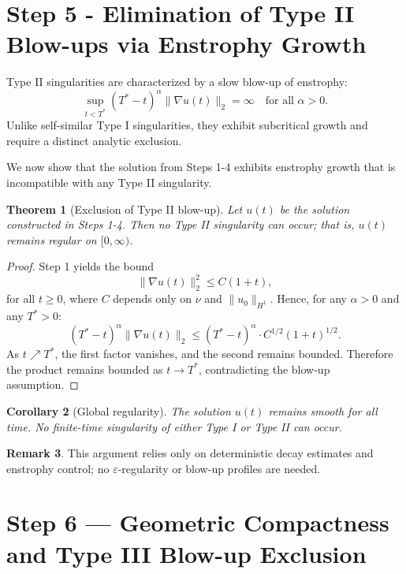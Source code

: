 \documentclass[11pt]{article}
\newtheorem{theorem}{Theorem}[section]
\newtheorem{corollary}[theorem]{Corollary}
\theoremstyle{definition}
\newtheorem{remark}[theorem]{Remark}
\begin{document}
\section{Step 5 - Elimination of Type II Blow-ups via Enstrophy Growth}
\label{sec:step5}

Type II singularities are characterized by a slow blow-up of enstrophy:
\[
\sup_{t < T^*} (T^* - t)^\alpha \|\nabla u(t)\|_2 = \infty \quad \text{for all } \alpha > 0.
\]
Unlike self-similar Type I singularities, they exhibit subcritical growth and require a distinct analytic exclusion.

We now show that the solution from Steps 1-4 exhibits enstrophy growth that is incompatible with any Type II singularity.

\begin{theorem}[Exclusion of Type II blow-up]\label{thm:typeII}
Let $u(t)$ be the solution constructed in Steps 1-4. Then no Type II singularity can occur; that is, $u(t)$ remains regular on $[0,\infty)$.
\end{theorem}

\begin{proof}
Step 1 yields the bound
\[
\|\nabla u(t)\|_2^2 \le C(1 + t),
\]
for all $t \ge 0$, where $C$ depends only on $\nu$ and $\|u_0\|_{H^1}$. Hence, for any $\alpha > 0$ and any $T^* > 0$:
\[
(T^* - t)^\alpha \|\nabla u(t)\|_2 \le (T^* - t)^\alpha \cdot C^{1/2} (1 + t)^{1/2}.
\]
As $t \nearrow T^*$, the first factor vanishes, and the second remains bounded. Therefore the product remains bounded as $t \to T^*$, contradicting the blow-up assumption.
\end{proof}

\begin{corollary}[Global regularity]\label{cor:global}
The solution $u(t)$ remains smooth for all time. No finite-time singularity of either Type I or Type II can occur.
\end{corollary}

\begin{remark}
This argument relies only on deterministic decay estimates and enstrophy control; no $\varepsilon$-regularity or blow-up profiles are needed.
\end{remark}

\section{Step 6 — Geometric Compactness and Type III Blow-up Exclusion}
\label{sec:step6}
\end{document}

